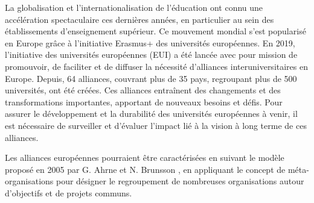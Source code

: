 La globalisation et l'internationalisation de l'éducation ont connu une accélération spectaculaire ces dernières années, en particulier au sein des établissements d'enseignement supérieur. Ce mouvement mondial s'est popularisé en Europe grâce à l'initiative Erasmus+ des universités européennes. En 2019, l'initiative des universités européennes (EUI) a été lancée avec pour mission de promouvoir, de faciliter et de diffuser la nécessité d'alliances interuniversitaires en Europe. Depuis, 64 alliances, couvrant plus de 35 pays, regroupant plus de 500 universités, ont été créées. Ces alliances entraînent des changements et des transformations importantes, apportant de nouveaux besoins et défis. Pour assurer le développement et la durabilité des universités européennes à venir, il est nécessaire de surveiller et d'évaluer l'impact lié à la vision à long terme de ces alliances.

Les alliances européennes pourraient être caractérisées en suivant le modèle proposé en 2005 par G. Ahrne et N. Brunsson \cite{ahrne_organizations_2005}, en appliquant le concept de méta-organisations pour désigner le regroupement de nombreuses organisations autour d'objectifs et de projets communs. 